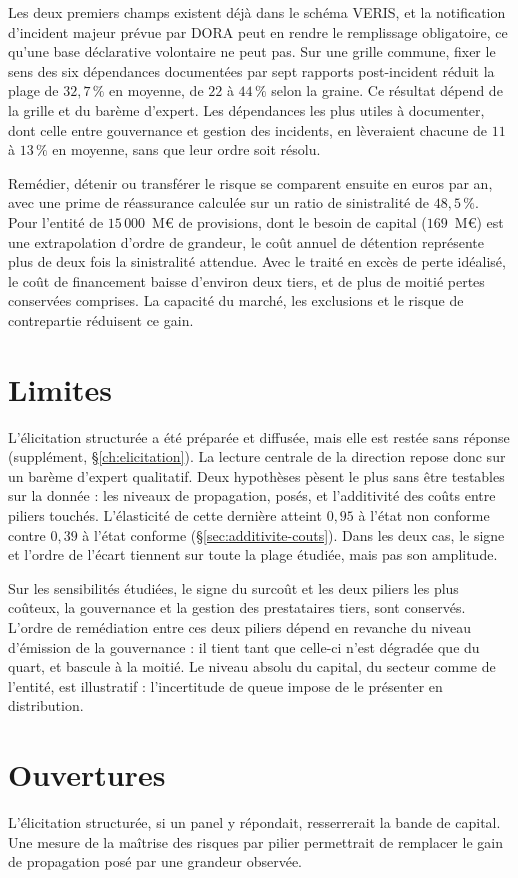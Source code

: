 Les deux premiers champs existent déjà dans le schéma VERIS, et la notification d'incident majeur
prévue par DORA peut en rendre le remplissage obligatoire, ce qu'une base déclarative volontaire ne
peut pas. Sur une grille commune, fixer le sens des six dépendances documentées par sept rapports post-incident réduit la plage de $32{,}7\,\%$ en moyenne,
de $22$ à $44\,\%$ selon la graine. Ce résultat dépend de la grille et du barème d'expert. Les dépendances les plus utiles à documenter, dont celle entre
gouvernance et gestion des incidents, en lèveraient chacune de $11$ à $13\,\%$ en moyenne, sans que leur ordre soit
résolu.


Remédier, détenir ou transférer le risque se comparent ensuite en euros par an, avec une prime de réassurance
calculée sur un ratio de sinistralité de $48{,}5\,\%$. Pour l'entité de $15\,000$~M\euro{} de provisions,
dont le besoin de capital ($169$~M\euro{}) est une extrapolation d'ordre de grandeur, le coût annuel
de détention représente plus de deux fois la sinistralité attendue. Avec le traité en excès de perte idéalisé,
le coût de financement baisse d'environ deux tiers, et de plus de moitié pertes conservées comprises.
La capacité du marché, les exclusions et le risque de contrepartie réduisent ce gain.




\section*{Limites}
L'élicitation structurée a été préparée et diffusée, mais elle est restée sans réponse (supplément,
\S\ref{ch:elicitation}). La lecture centrale de la direction repose donc sur un barème d'expert
qualitatif. Deux hypothèses pèsent le plus sans être testables sur la donnée : les niveaux de
propagation, posés, et l'additivité des coûts entre piliers touchés. L'élasticité de cette dernière atteint $0{,}95$ à
l'état non conforme contre $0{,}39$ à l'état conforme (\S\ref{sec:additivite-couts}).
Dans les deux cas, le signe et l'ordre de l'écart tiennent sur toute la plage étudiée, mais pas
son amplitude.

Sur les sensibilités étudiées, le signe du surcoût et les deux piliers les plus coûteux, la gouvernance et la gestion des
prestataires tiers, sont conservés. L'ordre de remédiation entre ces deux piliers dépend en revanche du
niveau d'émission de la gouvernance : il tient tant que celle-ci n'est dégradée que du
quart, et bascule à la moitié. Le niveau absolu du capital, du secteur comme de l'entité, est illustratif : l'incertitude de queue impose de le présenter en distribution.


\section*{Ouvertures}
L'élicitation structurée, si un panel y répondait, resserrerait la bande de capital. Une mesure de la maîtrise des risques par pilier permettrait de remplacer le gain de propagation
posé par une grandeur observée.
